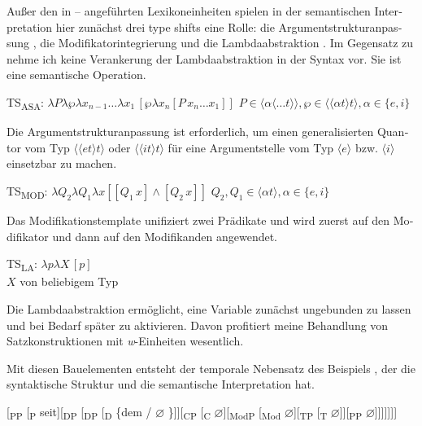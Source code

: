 \documentclass[output=paper, colorlinks, citecolor=brown, booklanguage=german]{langscibook}
\begin{document}
\begin{otherlanguage}{german}
Außer den in -- angeführten Lexikoneinheiten spielen in der semantischen Interpretation hier zunächst drei type shifts eine Rolle: die Argumentstrukturanpassung , die Modifikatorintegrierung  \citep{Zimmermann1992} und die Lambdaabstraktion . Im Gegensatz zu \citeauthor{Gronn-Stechow2010} nehme ich keine Verankerung der Lambdaabstraktion in der Syntax vor. Sie ist eine semantische Operation.

\ea \label{ex:18:25} TS\textsubscript{ASA}: $\lambda P \lambda \wp \lambda x_{n-1} \dots \lambda x_1\, [ \wp \lambda x_n [P\, x_n \dots x_1]]$
\newline
$P \in \langle\alpha \langle \dots t \rangle\rangle, \wp \in \langle\langle\alpha t \rangle t \rangle, \alpha \in \{e,i\}$
\z

\noindent Die Argumentstrukturanpassung ist erforderlich, um einen generalisierten Quantor vom Typ $\langle\langle et \rangle t \rangle$ oder $\langle\langle it \rangle t \rangle$ für eine Argumentstelle vom Typ $\langle e \rangle$ bzw. $\langle i \rangle$ einsetzbar zu machen.

\ea \label{ex:18:26} TS\textsubscript{MOD}: $\lambda Q_2 \lambda Q_1 \lambda x [[Q_1\, x] \wedge [Q_2\, x]]$ \newline
$Q_2, Q_1 \in \langle\alpha t \rangle, \alpha \in \{e,i\}$
\z

\noindent Das Modifikationstemplate unifiziert zwei Prädikate und wird zuerst auf den Modifikator und dann auf den Modifikanden angewendet.

\ea \label{ex:18:27} TS\textsubscript{LA}: $\lambda p \lambda X\, [p]$\\
$X$ von beliebigem Typ
\z

\noindent Die Lambdaabstraktion ermöglicht, eine Variable zunächst ungebunden zu lassen und bei Bedarf später zu aktivieren. Davon profitiert meine Behandlung von Satzkonstruktionen mit \textit{w}-Einheiten wesentlich.

Mit diesen Bauelementen entsteht der temporale Nebensatz des Beispiels , der die syntaktische Struktur  und die semantische Interpretation  hat.

\ea \label{ex:18:28} [\textsubscript{PP} [\textsubscript{P} seit][\textsubscript{DP} [\textsubscript{DP} [\textsubscript{D} \{dem / $\varnothing$ \}]][\textsubscript{CP} [\textsubscript{C} $\varnothing$][\textsubscript{ModP} [\textsubscript{Mod} $\varnothing$][\textsubscript{TP} [\textsubscript{T} $\varnothing$]\newline[\textsubscript{AspP} [\textsubscript{AspP} [\textsubscript{Asp} $\varnothing$][\textsubscript{VP} ich Peter kenne]][\textsubscript{PP} $\varnothing$]]]]]]]
\z


\end{otherlanguage}
\end{document}
